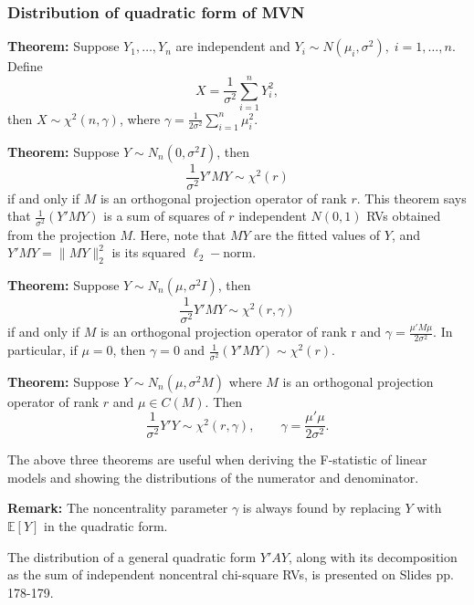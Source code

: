 \documentclass{article}
\theoremstyle{break}
\newcommand{\E}{\ensuremath{\mathbb{E}}}
\begin{document}
\subsubsection{Distribution of quadratic form of MVN}
\textbf{Theorem:} Suppose $Y_1, \ldots, Y_n$ are independent and 
    $Y_i \sim N(\mu_i, \sigma^2), \; i=1,\ldots,n$. Define
    \[
    X = \frac{1}{\sigma^2}\sum_{i=1}^n Y_i^2,
    \]
then $X \sim \chi^2(n, \gamma)$, where $\gamma = \frac{1}{2\sigma^2}\sum_{i=1}^n \mu_i^2$.

\textbf{Theorem:} Suppose $Y \sim N_n(0, \sigma^2I)$, then
\begin{equation*}
  \frac{1}{\sigma^2}Y'MY \sim \chi^2(r)
\end{equation*}
if and only if $M$ is an orthogonal projection operator of rank $r$.
This theorem says that $\frac{1}{\sigma^2}(Y'MY)$ is a sum of squares of $r$ independent $N(0,1)$ RVs obtained from the projection $M$.
Here, note that $MY$ are the fitted values of $Y$, and $Y'MY = \|MY\|_2^2$ is its squared $\ell_2-$norm.

\textbf{Theorem:} Suppose $Y \sim N_n(\mu, \sigma^2I)$, then
\begin{equation*}
  \frac{1}{\sigma^2}Y'MY \sim \chi^2(r, \gamma)
\end{equation*}
if and only if $M$ is an orthogonal projection operator of rank r and $\gamma = \frac{\mu'M\mu}{2\sigma^2}$.
In particular, if $\mu = 0$, then $\gamma=0$ and $\frac{1}{\sigma^2}(Y'MY) \sim \chi^2(r)$. 


\textbf{Theorem:} Suppose $Y \sim N_n(\mu, \sigma^2M)$ where $M$ is an orthogonal projection operator of rank $r$ and $\mu \in C(M)$. Then
\begin{equation*}
  \frac{1}{\sigma^2}Y'Y \sim \chi^2(r, \gamma),
  \qquad \gamma = \frac{\mu'\mu}{2 \sigma^2}.
\end{equation*}

The above three theorems are useful when deriving the F-statistic of linear models and showing the distributions of the numerator and denominator.

\textbf{Remark:} The noncentrality parameter $\gamma$ is always found by replacing $Y$ with $\E[Y]$ in the quadratic form.

The distribution of a general quadratic form $Y'AY$, along with its decomposition as the sum of independent noncentral chi-square RVs, is presented on Slides pp. 178-179.

\end{document}
